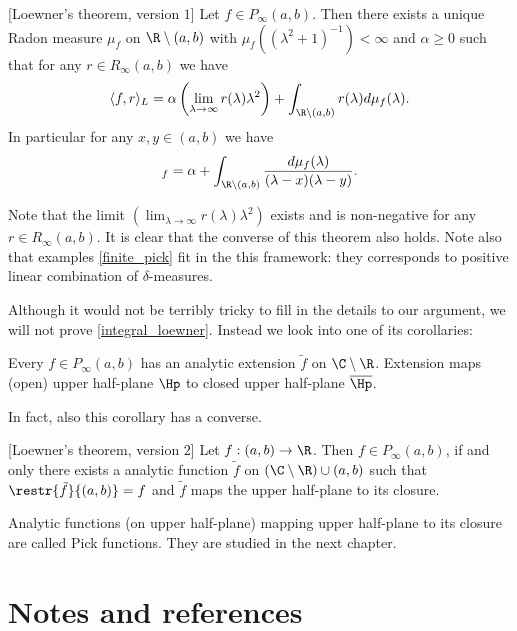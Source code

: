 \begin{lause}\label{integral_loewner}[Loewner's theorem, version $1$]
	Let $f \in P_{\infty}(a, b)$. Then there exists a unique Radon measure $\mu_{f}$ on $\R \setminus (a, b)$ with $\mu_{f}((\lambda^2 + 1)^{-1}) < \infty$ and $\alpha \geq 0$ such that for any $r \in R_{\infty}(a, b)$ we have
	\begin{align*}
		\langle f, r \rangle_{L} = \alpha \left(\lim_{\lambda \to \infty} r(\lambda) \lambda^2 \right) + \int_{\R \setminus (a, b)} r(\lambda) d \mu_{f}(\lambda).
	\end{align*}
	In particular for any $x,y \in (a, b)$ we have
	\begin{align*}
		[x, y]_{f} = \alpha + \int_{\R \setminus (a, b)} \frac{d \mu_{f}(\lambda)}{(\lambda - x) (\lambda - y)}.
	\end{align*}
\end{lause}

Note that the limit $\left(\lim_{\lambda \to \infty} r(\lambda) \lambda^2 \right)$ exists and is non-negative for any $r \in R_{\infty}(a, b)$. It is clear that the converse of this theorem also holds. Note also that examples \ref{finite_pick} fit in the this framework: they corresponds to positive linear combination of $\delta$-measures.

Although it would not be terribly tricky to fill in the details to our argument, we will not prove \ref{integral_loewner}. Instead we look into one of its corollaries:

\begin{kor}
	Every $f \in P_{\infty}(a, b)$ has an analytic extension $\tilde{f}$ on $\C \setminus \R$. Extension maps (open) upper half-plane $\Hp$ to closed upper half-plane $\overline{\Hp}$.
\end{kor}

In fact, also this corollary has a converse.

\begin{lause}\label{weak_loewner}[Loewner's theorem, version $2$]
	Let $f : (a, b) \to \R$. Then $f \in P_{\infty}(a, b)$, if and only there exists a analytic function $\tilde{f}$ on $(\C \setminus \R) \cup (a, b)$ such that $\restr{\tilde{f}}{(a, b)} = f$ and $\tilde{f}$ maps the upper half-plane to its closure.
\end{lause}

Analytic functions (on upper half-plane) mapping upper half-plane to its closure are called Pick functions. They are studied in the next chapter.

\section{Notes and references}
